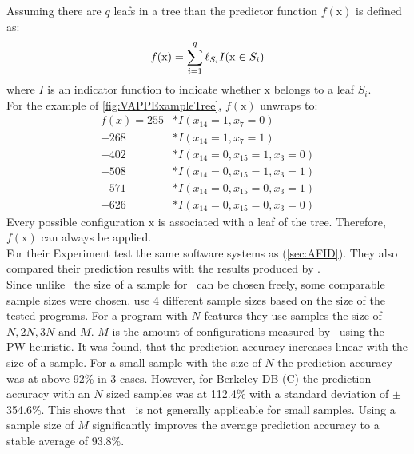 Assuming there are $q$ leafs in a tree than the predictor function $f(\mathrm{x})$ is defined as:
\begin{equation}\textsl{}
f(\mathrm{x})=\sum_{i=1}^{q} \ell_{S_i}I(\mathrm{x}\in S_i)
\end{equation}
where $I$ is an indicator function to indicate whether $\mathrm{x}$ belongs to a leaf $S_i$.\\
For the example of \cref{fig:VAPPExampleTree}, $f(\mathrm{x})$ unwraps to:
\begin{align*}
f(x) = 255&* I(x_{14}=1,x_7=0)\\[-0.1cm]
	 + 268&* I(x_{14}=1,x_7=1)\\[-0.1cm]
	 + 402&* I(x_{14}=0,x_{15}=1,x_3=0)\\[-0.1cm]
	 + 508&* I(x_{14}=0,x_{15}=1,x_3=1)\\[-0.1cm]
	 + 571&* I(x_{14}=0,x_{15}=0,x_3=1)\\[-0.1cm]
	 + 626&* I(x_{14}=0,x_{15}=0,x_3=0)
\end{align*}
Every possible configuration $\mathrm{x}$ is associated with a leaf of the tree. Therefore, $f(\mathrm{x})$ can always be applied.\\

For their Experiment \citet{VariabilityAwarePerformancePredictionJianmeiSigmundApel} test the same software systems as \citet{AutomatedFeatureDetectionSiegmund2012} (\cref{sec:AFID}). They also compared their prediction results with the results produced by \AFID.\\
Since unlike \AFID~the size of a sample for \VAPP~can be chosen freely, some comparable sample sizes were chosen. \citet{VariabilityAwarePerformancePredictionJianmeiSigmundApel} use 4 different sample sizes based on the size of the tested programs. For a program with $N$ features they use samples the size of $N,2N,3N \text{ and } M$. $M$ is the amount of configurations measured by \AFID~using the \hyperref[lab:PW]{PW-heuristic}.
It was found, that the prediction accuracy increases linear with the size of a sample. For a small sample with the size of $N$ the prediction accuracy was at above 92\% in 3 cases. However, for Berkeley DB (C) the prediction accuracy with an $N$ sized samples was at 112.4\% with a standard deviation of $\pm$354.6\%. This shows that \VAPP~is not generally applicable for small samples.
Using a sample size of $M$ significantly improves the average prediction accuracy to a stable average of 93.8\%.\\
